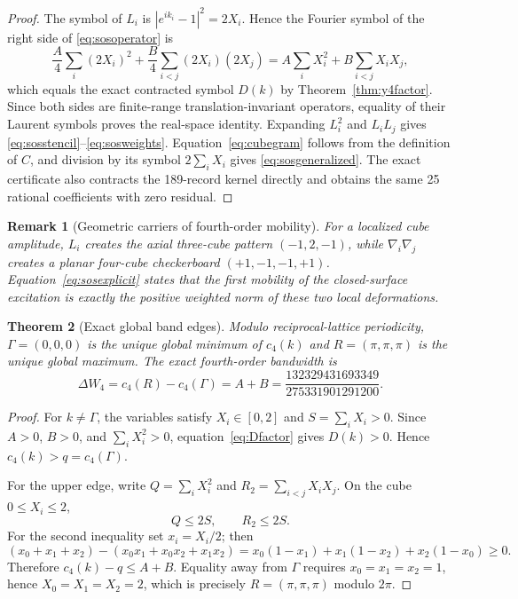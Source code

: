 \documentclass[11pt]{article}
\newtheorem{theorem}{Theorem}[section]
\newtheorem{remark}[theorem]{Remark}
\begin{document}
\begin{proof}
The symbol of $L_i$ is
$|e^{ik_i}-1|^2=2X_i$. Hence the Fourier symbol of the right side of
\eqref{eq:sosoperator} is
\[
\frac A4\sum_i(2X_i)^2
+\frac B4\sum_{i<j}(2X_i)(2X_j)
=A\sum_iX_i^2+B\sum_{i<j}X_iX_j,
\]
which equals the exact contracted symbol $D(k)$ by
Theorem~\ref{thm:y4factor}. Since both sides are finite-range
translation-invariant operators, equality of their Laurent symbols proves the
real-space identity. Expanding $L_i^2$ and $L_iL_j$ gives
\eqref{eq:sosstencil}--\eqref{eq:sosweights}. Equation~\eqref{eq:cubegram}
follows from the definition of $C$, and division by its symbol
$2\sum_iX_i$ gives \eqref{eq:sosgeneralized}. The exact certificate also
contracts the 189-record kernel directly and obtains the same 25 rational
coefficients with zero residual.
\end{proof}

\begin{remark}[Geometric carriers of fourth-order mobility]
For a localized cube amplitude, $L_i$ creates the axial three-cube pattern
$(-1,2,-1)$, while $\nabla_i\nabla_j$ creates a planar four-cube
checkerboard $(+1,-1,-1,+1)$. Equation~\eqref{eq:sosexplicit} states that the
first mobility of the closed-surface excitation is exactly the positive
weighted norm of these two local deformations.
\end{remark}

\begin{theorem}[Exact global band edges]\label{thm:y4edges}
Modulo reciprocal-lattice periodicity, $\Gamma=(0,0,0)$ is the unique global
minimum of $c_4(k)$ and $R=(\pi,\pi,\pi)$ is the unique global maximum.
The exact fourth-order bandwidth is
\begin{equation}
\Delta W_4=c_4(R)-c_4(\Gamma)
=A+B
=\frac{132329431693349}{275331901291200}.
\label{eq:bandwidth4}
\end{equation}
\end{theorem}



\begin{proof}
For $k\neq\Gamma$, the variables satisfy $X_i\in[0,2]$ and
$S=\sum_iX_i>0$. Since $A>0$, $B>0$, and
$\sum_iX_i^2>0$, equation~\eqref{eq:Dfactor} gives $D(k)>0$. Hence
$c_4(k)>q=c_4(\Gamma)$.

For the upper edge, write
$Q=\sum_iX_i^2$ and $R_2=\sum_{i<j}X_iX_j$. On the cube
$0\leq X_i\leq2$,
\[
Q\leq2S,
\qquad R_2\leq2S.
\]
For the second inequality set $x_i=X_i/2$; then
\[
(x_0+x_1+x_2)-(x_0x_1+x_0x_2+x_1x_2)
=x_0(1-x_1)+x_1(1-x_2)+x_2(1-x_0)\geq0.
\]
Therefore $c_4(k)-q\leq A+B$. Equality away from $\Gamma$ requires
$x_0=x_1=x_2=1$, hence $X_0=X_1=X_2=2$, which is precisely
$R=(\pi,\pi,\pi)$ modulo $2\pi$.
\end{proof}
\end{document}
